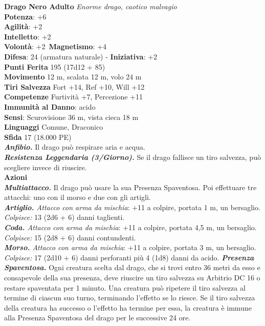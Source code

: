 \begin{multicols}{2}
\medskip\textbf{Drago Nero Adulto}
\emph{Enorme drago, caotico malvagio}\\
\textbf{Potenza}: +6\\
\textbf{Agilità}: +2\\
\textbf{Intelletto}: +2\\
\textbf{Volontà}: +2\
\textbf{Magnetismo}: +4\\
\textbf{Difesa}: 24 (armatura naturale) - \textbf{Iniziativa}: +2\\
\textbf{Punti Ferita} 195 (17d12 + 85)\\
\textbf{Movimento} 12 m, scalata 12 m, volo 24 m\\
\textbf{Tiri Salvezza} Fort +14, Ref +10, Will +12\\
\textbf{Competenze} Furtività +7, Percezione +11\\
\textbf{Immunità al Danno}: acido\\
\textbf{Sensi}: Scurovisione 36 m, vista cieca 18 m\\
\textbf{Linguaggi} Comune, Draconico\\
\textbf{Sfida} 17 (18.000 PE)\smallskip\\
\emph{\textbf{Anfibio.}} Il drago può respirare aria e acqua.\\
\emph{\textbf{Resistenza Leggendaria (3/Giorno).}} Se il drago fallisce un tiro salvezza, può scegliere invece di riuscire.\\
\smallskip\textbf{Azioni}\\
\emph{\textbf{Multiattacco.}} Il drago può usare la sua Presenza Spaventosa. Poi effettuare tre attacchi: uno con il morso e due con gli artigli.\\
\emph{\textbf{Artiglio.} Attacco con arma da mischia}: +11 a colpire, portata 1 m, un bersaglio.\\
\emph{Colpisce:} 13 (2d6 + 6) danni taglienti.\\
\emph{\textbf{Coda.} Attacco con arma da mischia}: +11 a colpire, portata 4,5 m, un bersaglio.\\
\emph{Colpisce:} 15 (2d8 + 6) danni contundenti. \\
\emph{\textbf{Morso.} Attacco con arma da mischia}: +11 a colpire, portata 3 m, un bersaglio.\\
\emph{Colpisce:} 17 (2d10 + 6) danni perforanti più 4 (1d8) danni da acido.
\emph{\textbf{Presenza Spaventosa.}} Ogni creatura scelta dal drago, che si trovi entro 36 metri da esso e consapevole della sua presenza, deve riuscire un tiro salvezza su Arbitrio DC 16 o restare spaventata per 1 minuto. Una creatura può ripetere il tiro salvezza al termine di ciascun suo turno, terminando l'effetto se lo riesce. Se il tiro salvezza della creatura ha successo o l'effetto ha termine per essa, la creatura è immune alla Presenza Spaventosa del drago per le successive 24 ore.\\

\end{multicols}
